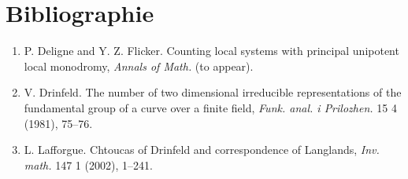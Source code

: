 \documentclass[11pt,a4paper]{article}
\theoremstyle{plain}
\theoremstyle{definition}
\begin{document}
\section*{Bibliographie}

\begin{enumerate}
\item[{[DF]}] P. Deligne and Y. Z. Flicker. Counting local systems with principal unipotent local monodromy, \textit{Annals of Math.} (to appear).
\item[{[Dr]}] V. Drinfeld. The number of two dimensional irreducible representations of the fundamental group of a curve over a finite field, \textit{Funk. anal. i Prilozhen.} 15 4 (1981), 75--76.
\item[{[L]}] L. Lafforgue. Chtoucas of Drinfeld and correspondence of Langlands, \textit{Inv. math.} 147 1 (2002), 1--241.
\end{enumerate}
\end{document}
